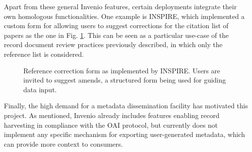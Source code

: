 Apart from these general Invenio features, certain deployments integrate their
own homologous functionalities. One example is INSPIRE, which implemented a
custom form for allowing users to suggest corrections for the citation list of
papers as the one in Fig. \ref{fig:inspire}. This can be seen as a particular
use-case of the record document review practices previously described, in which
only the reference list is considered.

\begin{figure}[!ht]
  \centering
  \caption[Reference correction form as implemented by INSPIRE.]
          {Reference correction form as implemented by INSPIRE. Users are
           invited to suggest amends, a structured form being used for guiding
           data input.}
  \label{fig:inspire}
\end{figure}

Finally, the high demand for a metadata dissemination facility has motivated
this project. As mentioned, Invenio already includes features enabling record
harvesting in compliance with the OAI protocol, but currently does not
implement any specific mechanism for exporting user-generated metadata, which
can provide more context to consumers.
